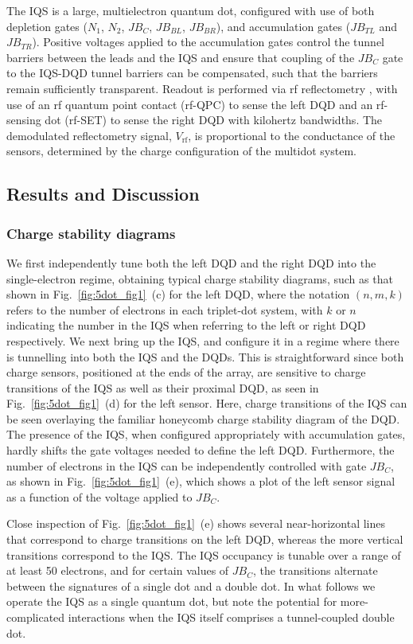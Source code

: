 The IQS is a large, multielectron quantum dot, configured with use of both depletion gates ($N_{1}$, $N_{2}$, $JB_{C}$, $JB_{BL}$, $JB_{BR}$), and accumulation gates ($JB_{TL}$ and $JB_{TR}$).  Positive voltages applied to the accumulation gates control the tunnel barriers between the leads and the IQS and ensure that coupling of the $JB_{C}$ gate to the IQS-DQD tunnel barriers can be compensated, such that the barriers remain sufficiently transparent. Readout is performed via rf reflectometry \cite{readoutreilly}, with use of an rf quantum point contact (rf-QPC) to sense the left DQD and an rf-sensing dot (rf-SET) to sense the right DQD with kilohertz bandwidths. The demodulated reflectometry signal, $V_{\textrm{rf}}$, is proportional to the conductance of the sensors, determined by the charge configuration of the multidot system.

\subsection{Results and Discussion}
\subsubsection{Charge stability diagrams}
We first independently tune both the left DQD and the right DQD into the single-electron regime, obtaining typical charge stability diagrams, such as that shown in Fig.~\ref{fig:5dot_fig1}~(c) for the left DQD, where the notation $\left(n,m,k\right)$ refers to the number of electrons in each triplet-dot system, with $k$ or $n$ indicating the number in the IQS when referring to the left or right DQD respectively. We next bring up the IQS, and configure it in a regime where there is tunnelling into both the IQS and the DQDs. This is straightforward since both charge sensors, positioned at the ends of the array, are sensitive to charge transitions of the IQS as well as their proximal DQD, as seen in Fig.~\ref{fig:5dot_fig1}~(d) for the left sensor. Here, charge transitions of the IQS can be seen overlaying the familiar honeycomb charge stability diagram of the DQD. The presence of the IQS, when configured appropriately with accumulation gates,  hardly shifts the gate voltages needed to define the left DQD. Furthermore, the number of electrons in the IQS can be independently controlled with gate $JB_{C}$, as shown in Fig.~\ref{fig:5dot_fig1}~(e), which shows a plot of the left sensor signal as a function of the voltage applied to $JB_{C}$. 

Close inspection of Fig.~\ref{fig:5dot_fig1}~(e) shows several near-horizontal lines that correspond to charge transitions on the left DQD,  whereas the more vertical transitions correspond to the IQS. The IQS occupancy is tunable over a range of at least 50 electrons, and for certain values of $JB_{C}$, the transitions alternate between the signatures of a single dot and a double dot. In what follows we operate the IQS as a single quantum dot, but note the potential for more-complicated interactions when the IQS itself comprises a tunnel-coupled double dot. 
 
